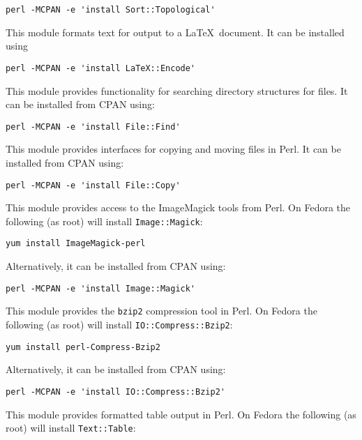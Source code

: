 \begin{description}
\begin{description}
\begin{verbatim}
perl -MCPAN -e 'install Sort::Topological'
\end{verbatim}
  \item [\href{http://search.cpan.org/~andrewf/LaTeX-Encode-0.03/lib/LaTeX/Encode.pm}{{\tt LaTeX::Encode }}] This module formats text for output to a \LaTeX\ document. It can be installed using
\begin{verbatim}
perl -MCPAN -e 'install LaTeX::Encode'
\end{verbatim}
  \item [\href{http://search.cpan.org/~jesse/perl-5.12.1/lib/File/Find.pm}{{\tt File::Find}}] This module provides functionality for searching directory structures for files. It can be installed from CPAN using:
\begin{verbatim}
perl -MCPAN -e 'install File::Find'
\end{verbatim}
  \item [\href{http://search.cpan.org/~jesse/perl-5.12.1/lib/File/Copy.pm}{{\tt File::Copy}}] This module provides interfaces for copying and moving files in Perl. It can be installed from CPAN using:
\begin{verbatim}
perl -MCPAN -e 'install File::Copy'
\end{verbatim}
  \item [\href{http://search.cpan.org/~jcristy/PerlMagick-6.59/Magick.pm}{{\tt Image::Magick}}] This module provides access to the {\sc ImageMagick} tools from Perl. On Fedora the following (as root) will install {\tt Image::Magick}:
\begin{verbatim}
yum install ImageMagick-perl
\end{verbatim}
Alternatively, it can be installed from CPAN using:
\begin{verbatim}
perl -MCPAN -e 'install Image::Magick'
\end{verbatim}
  \item [\href{http://perldoc.perl.org/IO/Compress/Bzip2.html}{{\tt IO::Compress::Bzip2}}] This module provides the {\tt bzip2} compression tool in Perl. On Fedora the following (as root) will install {\tt IO::Compress::Bzip2}:
\begin{verbatim}
yum install perl-Compress-Bzip2
\end{verbatim}
Alternatively, it can be installed from CPAN using:
\begin{verbatim}
perl -MCPAN -e 'install IO::Compress::Bzip2'
\end{verbatim}
  \item [\href{http://search.cpan.org/~anno/Text-Table-1.114/lib/Text/Table.pm}{{\tt Text::Table}}] This module provides formatted table output in Perl. On Fedora the following (as root) will install {\tt Text::Table}:

\end{description}
\end{description}
